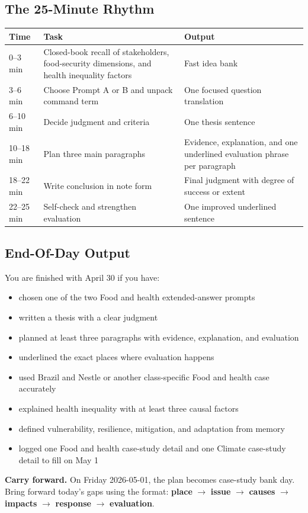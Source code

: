 \documentclass[11pt,a4paper]{article}
\newcommand{\term}[1]{\textcolor{HeadingBlue}{\textbf{#1}}}
\newcommand{\boxnote}[3]{%
\noindent\colorbox{#1}{%
  \begin{minipage}{0.965\textwidth}
  \sffamily
  \textbf{\textcolor{HeadingBlue}{#2}} #3
  \end{minipage}
}}
\begin{document}
\subsection{The 25-Minute Rhythm}

\begin{tabularx}{\textwidth}{L{0.15\textwidth}Y Y}
\toprule
\textbf{Time} & \textbf{Task} & \textbf{Output} \\
--3 min & Closed-book recall of stakeholders, food-security dimensions, and
health inequality factors & Fast idea bank \\
3--6 min & Choose Prompt A or B and unpack command term & One focused question
translation \\
6--10 min & Decide judgment and criteria & One thesis sentence \\
10--18 min & Plan three main paragraphs & Evidence, explanation, and one
underlined evaluation phrase per paragraph \\
18--22 min & Write conclusion in note form & Final judgment with degree of
success or extent \\
22--25 min & Self-check and strengthen evaluation & One improved underlined
sentence \\
\bottomrule
\end{tabularx}

\subsection{End-Of-Day Output}

You are finished with April 30 if you have:

\begin{itemize}
  \item chosen one of the two Food and health extended-answer prompts
  \item written a thesis with a clear judgment
  \item planned at least three paragraphs with evidence, explanation, and
  evaluation
  \item underlined the exact places where evaluation happens
  \item used Brazil and Nestle or another class-specific Food and health case
  accurately
  \item explained health inequality with at least three causal factors
  \item defined vulnerability, resilience, mitigation, and adaptation from
  memory
  \item logged one Food and health case-study detail and one Climate case-study
  detail to fill on May 1
\end{itemize}

\boxnote{SoftGreen}{Carry forward.}{On Friday 2026-05-01, the plan becomes
case-study bank day. Bring forward today's gaps using the format:
\term{place} $\rightarrow$ \term{issue} $\rightarrow$ \term{causes}
$\rightarrow$ \term{impacts} $\rightarrow$ \term{response} $\rightarrow$
\term{evaluation}.}
\end{document}
